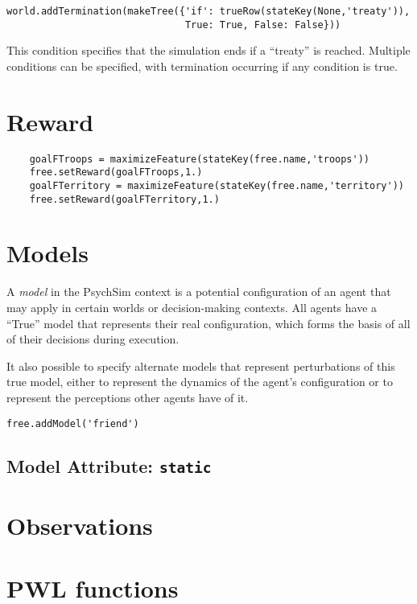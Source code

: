 \documentclass{article}
\begin{document}
\begin{verbatim}
world.addTermination(makeTree({'if': trueRow(stateKey(None,'treaty')),
                               True: True, False: False}))
\end{verbatim}

This condition specifies that the simulation ends if a ``treaty'' is reached. Multiple conditions can be specified, with termination occurring if any condition is true.


\section{Reward}

\begin{verbatim}
    goalFTroops = maximizeFeature(stateKey(free.name,'troops'))
    free.setReward(goalFTroops,1.)
    goalFTerritory = maximizeFeature(stateKey(free.name,'territory'))
    free.setReward(goalFTerritory,1.)
\end{verbatim}

\section{Models}

A {\em model} in the PsychSim context is a potential configuration of an agent that may apply in certain worlds or decision-making contexts. All agents have a ``True'' model that represents their real configuration, which forms the basis of all of their decisions during execution. 


It also possible to specify alternate models that represent perturbations of this true model, either to represent the dynamics of the agent's configuration or to represent the perceptions other agents have of it.

\begin{verbatim}
free.addModel('friend')
\end{verbatim}

\subsection{Model Attribute: {\tt static}}

\section{Observations}

\section{PWL functions}\label{sec:pwl}
\end{document}
